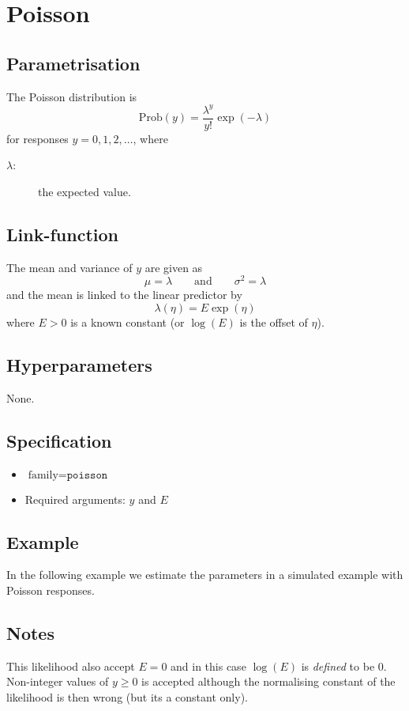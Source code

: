 \documentclass[a4paper,11pt]{article}
\begin{document}
\section*{Poisson}

\subsection*{Parametrisation}

The Poisson distribution is
\begin{displaymath}
    \text{Prob}(y) = \frac{\lambda^{y}}{y!}\exp(-\lambda)
\end{displaymath}
for responses $y=0, 1, 2, \ldots$, where
\begin{description}
\item[$\lambda$:] the expected value.
\end{description}

\subsection*{Link-function}

The mean and variance of $y$ are given as
\begin{displaymath}
    \mu = \lambda \qquad\text{and}\qquad \sigma^{2} = \lambda
\end{displaymath}
and the mean is linked to the linear predictor by
\begin{displaymath}
    \lambda(\eta) = E \exp(\eta)
\end{displaymath}
where $E>0$ is a known constant (or $\log(E)$ is the offset of $\eta$).

\subsection*{Hyperparameters}

None.

\subsection*{Specification}

\begin{itemize}
\item $\text{family}=\texttt{poisson}$
\item Required arguments: $y$ and $E$
\end{itemize}

\subsection*{Example}

In the following example we estimate the parameters in a simulated
example with Poisson responses.


\subsection*{Notes}

This likelihood also accept $E=0$ and in this case $\log(E)$ is
\emph{defined} to be $0$. Non-integer values of $y \ge 0$ is accepted
although the normalising constant of the likelihood is then wrong (but
its a constant only).
\end{document}
